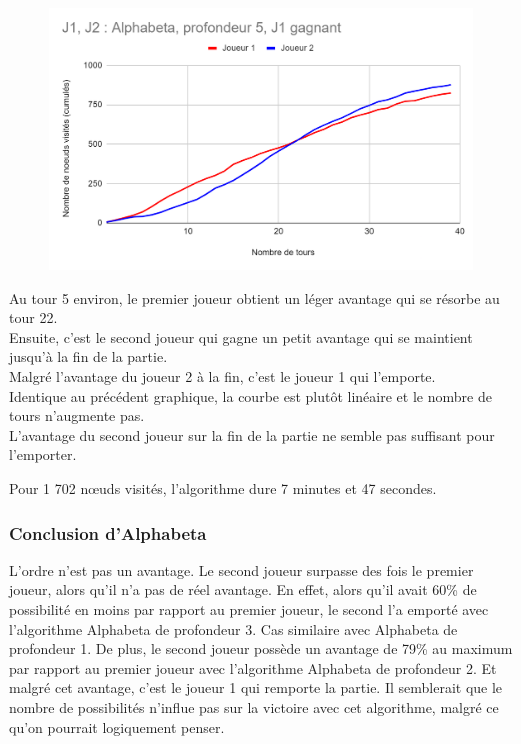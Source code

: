 \documentclass[12pt]{article}
\begin{document}
\begin{figure}[!h]
   \includegraphics[width=\textwidth]{prof5alphabeta.png}
\end{figure}

Au tour 5 environ, le premier joueur obtient un léger avantage qui se résorbe au tour 22.\\
Ensuite, c'est le second joueur qui gagne un petit avantage qui se maintient jusqu'à la fin de la partie.\\
Malgré l'avantage du joueur 2 à la fin, c'est le joueur 1 qui l'emporte.\\

Identique au précédent graphique, la courbe est plutôt linéaire et le nombre de tours n'augmente pas.\\
L'avantage du second joueur sur la fin de la partie ne semble pas suffisant pour l'emporter.

Pour 1 702 nœuds visités, l’algorithme dure 7 minutes et 47 secondes. 
\newpage
\subsubsection{Conclusion d’Alphabeta}

L'ordre n'est pas un avantage.
Le second joueur surpasse des fois le premier joueur, alors qu'il n'a pas de réel avantage. En effet, alors qu'il avait 60\% de possibilité en moins par rapport au premier joueur, le second l'a emporté avec l'algorithme Alphabeta de profondeur 3. Cas similaire avec Alphabeta de profondeur 1.
De plus, le second joueur possède un avantage de 79\% au maximum par rapport au premier joueur avec l'algorithme Alphabeta de profondeur 2. Et malgré cet avantage, c'est le joueur 1 qui remporte la partie.
Il semblerait que le nombre de possibilités n'influe pas sur la victoire avec cet algorithme, malgré ce qu'on pourrait logiquement penser.\\
\end{document}
